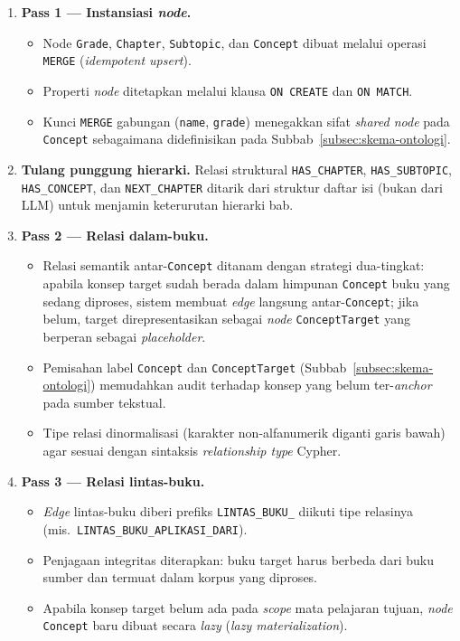 \documentclass[main]{subfiles}
\begin{document}
\begin{enumerate}
  \item \textbf{Pass 1 --- Instansiasi \textit{node}.}
  \begin{itemize}
    \item Node \texttt{Grade}, \texttt{Chapter}, \texttt{Subtopic}, dan
      \texttt{Concept} dibuat melalui operasi \texttt{MERGE}
      (\textit{idempotent upsert}).
    \item Properti \textit{node} ditetapkan melalui klausa \texttt{ON CREATE} dan
      \texttt{ON MATCH}.
    \item Kunci \texttt{MERGE} gabungan (\texttt{name}, \texttt{grade}) menegakkan
      sifat \textit{shared \textit{node}} pada \texttt{Concept} sebagaimana didefinisikan
      pada Subbab~\ref{subsec:skema-ontologi}.
  \end{itemize}

  \item \textbf{Tulang punggung hierarki.} Relasi struktural
  \texttt{HAS\_CHAPTER}, \texttt{HAS\_SUBTOPIC}, \texttt{HAS\_CONCEPT}, dan
  \texttt{NEXT\_CHAPTER} ditarik dari struktur daftar isi (bukan dari LLM)
  untuk menjamin keterurutan hierarki bab.

  \item \textbf{Pass 2 --- Relasi dalam-buku.}
  \begin{itemize}
    \item Relasi semantik antar-\texttt{Concept} ditanam dengan strategi
      dua-tingkat: apabila konsep target sudah berada dalam himpunan
      \texttt{Concept} buku yang sedang diproses, sistem membuat \textit{edge}
      langsung antar-\texttt{Concept}; jika belum, target direpresentasikan
      sebagai \textit{node} \texttt{ConceptTarget} yang berperan sebagai
      \textit{placeholder}.
    \item Pemisahan label \texttt{Concept} dan \texttt{ConceptTarget}
      (Subbab~\ref{subsec:skema-ontologi}) memudahkan audit terhadap konsep yang
      belum ter-\textit{anchor} pada sumber tekstual.
    \item Tipe relasi dinormalisasi (karakter non-alfanumerik diganti garis
      bawah) agar sesuai dengan sintaksis \textit{relationship type} Cypher.
  \end{itemize}

  \item \textbf{Pass 3 --- Relasi lintas-buku.}
  \begin{itemize}
    \item \textit{Edge} lintas-buku diberi prefiks \texttt{LINTAS\_BUKU\_}
      diikuti tipe relasinya (mis.\ \texttt{LINTAS\_BUKU\_APLIKASI\_DARI}).
    \item Penjagaan integritas diterapkan: buku target harus berbeda dari buku
      sumber dan termuat dalam korpus yang diproses.
    \item Apabila konsep target belum ada pada \textit{scope} mata pelajaran
      tujuan, \textit{node} \texttt{Concept} baru dibuat secara \textit{lazy}
      (\textit{lazy materialization}).
  \end{itemize}


\end{enumerate}
\end{document}

